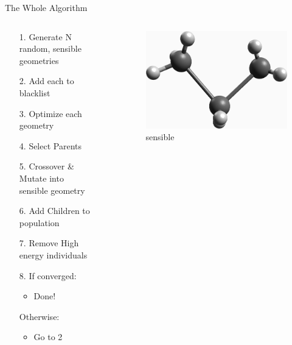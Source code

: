 \documentclass[10pt]{beamer}
\begin{document}
\begin{frame}{The Whole Algorithm}
	\begin{columns}[c] %
		\begin{column}{.48\textwidth}
			\begin{itemize}[<+->]
				\item[1.] {Generate N random, sensible geometries}
				\item[2.] {Add each to blacklist}
				\item[3.] {Optimize each geometry}
				\item[4.] {Select Parents}
				\item[5.] {Crossover \& Mutate into sensible geometry}
				\item[6.] {Add Children to population}
				\item[7.] {Remove High energy individuals}
				\item[8.] {If converged:}
				\begin{itemize}
					\item{Done!}
				\end{itemize}
				\item[] {Otherwise:}
				\begin{itemize}
					\item{Go to 2}
				\end{itemize}
			\end{itemize}
		\end{column}
		\hfill
		\begin{column}{0.48\textwidth}
			\onslide<11>\begin{itemize}
				\medskip
				\item[]{
					\begin{figure}
						\includegraphics[width=0.8\linewidth]{images/sense.png}
						\caption*{sensible}
					\end{figure}
}
\end{itemize}
\end{column}
\end{columns}
\end{frame}
\end{document}
